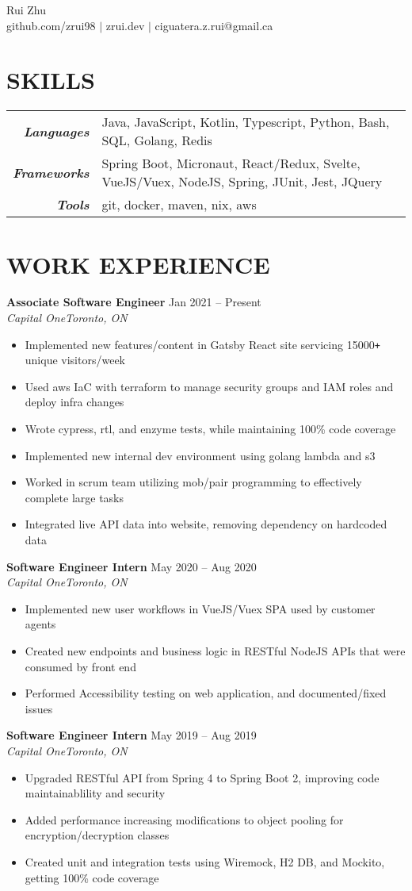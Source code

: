 \documentclass[letterpaper]{article}
\newcommand{\Header}[2]{\begin{center}
	\huge\usefont{OT1}{lmss}{m}{n}
		#1 \\
	\small #2
\end{center}}
\newcommand{\SplitEntry}[2]{\textbf{\textit{#1}} & #2\\}
\newcommand{\NewPart}[1]{\section*{\uppercase{\large\textbf{#1}}}}
\newcommand{\DatedEntry}[5]{\large\textbf{#1}
	\hfill \small#2\\
	\textit{#3}\hfill\textit{#4}\\\vspace{0.10cm}
	#5\vspace{0.1cm}
}
\begin{document}
\Header{Rui Zhu}{github.com/zrui98 $|$ zrui.dev $|$ ciguatera.z.rui@gmail.ca}\vspace{-0.5cm}

\NewPart{Skills}{}
\begin{tabular}{r|l}
	\SplitEntry{Languages}{Java, JavaScript, Kotlin, Typescript, Python, Bash, SQL, Golang, Redis}
	\SplitEntry{Frameworks}{Spring Boot, Micronaut, React/Redux, Svelte, VueJS/Vuex, NodeJS, Spring, JUnit, Jest, JQuery}
	\SplitEntry{Tools}{git, docker, maven, nix, aws}
\end{tabular}\vspace{-0.2cm}

\NewPart{Work Experience}{}
\DatedEntry{Associate Software Engineer}
{Jan 2021 -- Present}
{Capital One}
{Toronto, ON}
{\begin{itemize}[nolistsep]
	\item Implemented new features/content in Gatsby React site servicing 15000\texttt{+} unique visitors/week
	\item Used aws IaC with terraform to manage security groups and IAM roles and deploy infra changes
	\item Wrote cypress, rtl, and enzyme tests, while maintaining 100\% code coverage
	\item Implemented new internal dev environment using golang lambda and s3
	\item Worked in scrum team utilizing mob/pair programming to effectively complete large tasks
	\item Integrated live API data into website, removing dependency on hardcoded data
\end{itemize}}
\DatedEntry{Software Engineer Intern}
{May 2020 -- Aug 2020}
{Capital One}
{Toronto, ON}
{\begin{itemize}[nolistsep]
	\item Implemented new user workflows in VueJS/Vuex SPA used by customer agents
	\item Created new endpoints and business logic in RESTful NodeJS APIs that were consumed by front end
	\item Performed Accessibility testing on web application, and documented/fixed issues
\end{itemize}}
\DatedEntry{Software Engineer Intern}
{May 2019 -- Aug 2019}
{Capital One}
{Toronto, ON}
{\begin{itemize}[nolistsep]
	\item Upgraded RESTful API from Spring 4 to Spring Boot 2, improving code maintainablility and security
	\item Added performance increasing modifications to object pooling for encryption/decryption classes
	\item Created unit and integration tests using Wiremock, H2 DB, and Mockito, getting 100\% code coverage
\end{itemize}}
\end{document}

